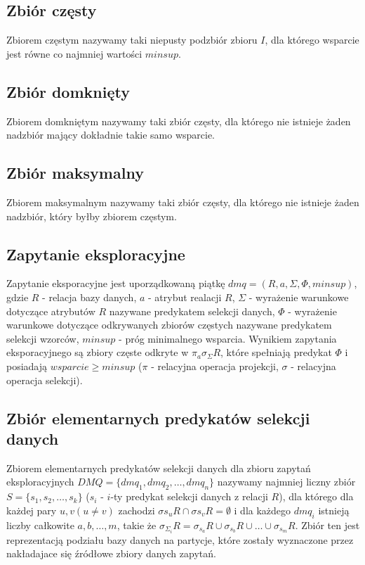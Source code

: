 \subsection{Zbiór częsty}
\label{c226}
Zbiorem częstym nazywamy taki niepusty podzbiór zbioru \(I\), dla którego wsparcie jest równe co najmniej wartości \(minsup\).

\subsection{Zbiór domknięty}
\label{c227}
Zbiorem domkniętym nazywamy taki zbiór częsty, dla którego nie istnieje żaden nadzbiór mający dokładnie takie samo wsparcie.

\subsection{Zbiór maksymalny}
\label{c228}
Zbiorem maksymalnym nazywamy taki zbiór częsty, dla którego nie istnieje żaden nadzbiór, który byłby zbiorem częstym.

\subsection{Zapytanie eksploracyjne}
\label{c229}
Zapytanie eksporacyjne jest uporządkowaną piątkę \(dmq = (R, a, \Sigma, \Phi, minsup) \), gdzie \(R\) - relacja bazy danych, \(a\) - atrybut realacji \(R\), \(\Sigma\) - wyrażenie warunkowe dotyczące atrybutów \(R\) nazywane predykatem selekcji danych, \(\Phi\) - wyrażenie warunkowe dotyczące odkrywanych zbiorów częstych nazywane predykatem selekcji wzorców, \(minsup\) - próg minimalnego wsparcia. Wynikiem zapytania eksporacyjnego są zbiory częste odkryte w \(\pi _a \sigma _\Sigma R \), które spełniają predykat \(\Phi\) i posiadają \(wsparcie \geq minsup\) (\(\pi\) - relacyjna operacja projekcji, \(\sigma\) - relacyjna operacja selekcji).


\subsection{Zbiór elementarnych predykatów selekcji danych}
\label{c2210}
Zbiorem elementarnych predykatów selekcji danych dla zbioru zapytań eksploracyjnych \(DMQ = \{dmq_1, dmq_2, \dots, dmq_n\}\) nazywamy najmniej liczny zbiór \(S = \{s_1, s_2, \dots, s_k\}\) (\(s_i\) - \(i\)-ty predykat selekcji danych z relacji \(R\)), dla którego dla każdej pary \(u, v (u \neq v)\) zachodzi \(\sigma{s_u}R \cap \sigma{s_v}R = \emptyset\)  i dla każdego \(dmq_i\) istnieją liczby całkowite \(a, b, \dots, m\), takie że \(\sigma_{\Sigma_i}R = \sigma_{s_a}R \cup \sigma_{s_b}R \cup \dots \cup \sigma_{s_m}R\). Zbiór ten jest reprezentacją podziału bazy danych na partycje, które zostały wyznaczone przez nakładajace się źródłowe zbiory danych zapytań.